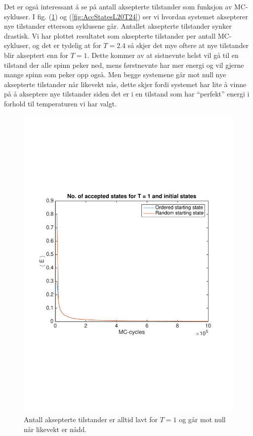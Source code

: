 \documentclass[norsk, 10pt]{article}
\begin{document}
Det er også interessant å se på antall aksepterte tilstander som funksjon av MC-sykluser. I fig. (\ref{fig:AccStatesL20T1}) og (\ref{fig:AccStatesL20T24}) ser vi hvordan systemet aksepterer nye tilstander ettersom syklusene går. Antallet aksepterte tilstander synker drastisk. Vi har plottet resultatet som aksepterte tilstander per antall MC-sykluser, og det er tydelig at for $T=2.4$ så skjer det mye oftere at nye tilstander blir akseptert enn for $T=1$. Dette kommer av at sistnevnte helst vil gå til en tilstand der alle spinn peker ned, mens førstnevnte har mer energi og vil gjerne mange spinn som peker opp også. Men begge systemene går mot null nye aksepterte tilstander når likevekt nås, dette skjer fordi systemet har lite å vinne på å akseptere nye tilstander siden det er i en tilstand som har ``perfekt'' energi i forhold til temperaturen vi har valgt.

\begin{figure}[H]
	\centering
	\includegraphics[scale = 0.5, trim = 1cm 8cm 1cm 8cm]{AccStatesL20T1.pdf}
	\caption{Antall aksepterte tilstander er alltid lavt for $T=1$ og går mot null når likevekt er nådd.}
	\label{fig:AccStatesL20T1}
\end{figure}
\end{document}
